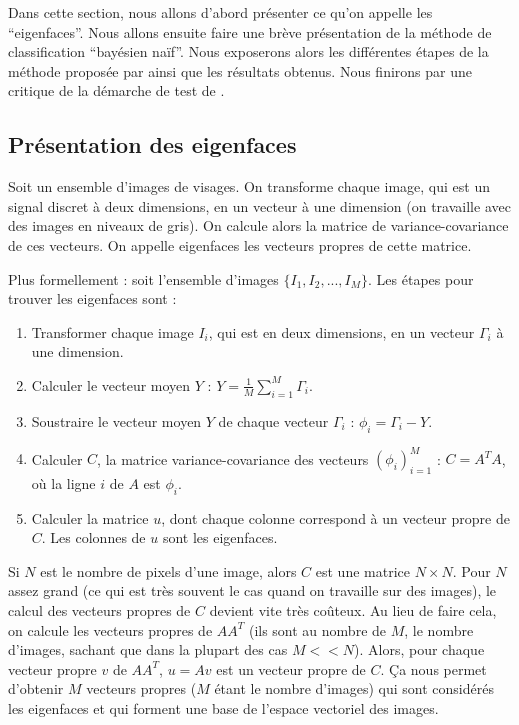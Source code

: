 Dans cette section, nous allons d'abord présenter ce qu'on appelle les ``eigenfaces''.
Nous allons ensuite faire une brève présentation de la méthode de classification
``bayésien naïf''. Nous exposerons alors les différentes étapes de la méthode proposée
par \cite{article} ainsi que les résultats obtenus. Nous finirons par une critique de
la démarche de test de \cite{article}.


\subsection{Présentation des eigenfaces} \label{subsection:presentation_eigenfaces}
Soit un ensemble d'images de visages. On transforme chaque image, qui est un signal
discret à deux dimensions, en un vecteur à une dimension (on travaille avec des
images en niveaux de gris). On calcule alors la matrice de variance-covariance
de ces vecteurs. On appelle eigenfaces les vecteurs propres de cette matrice.

Plus formellement : soit l'ensemble d'images $\{I_1, I_2, ..., I_M\}$.
Les étapes pour trouver les eigenfaces sont :
\begin{enumerate}
    \item Transformer chaque image $I_i$, qui est en deux dimensions,
    en un vecteur $\Gamma_i$ à une dimension.
    \item Calculer le vecteur moyen $Y$ : $Y = \frac{1}{M} \sum_{i=1}^M \Gamma_i$.
    \item Soustraire le vecteur moyen $Y$ de chaque vecteur $\Gamma_i$ : $\phi_i = \Gamma_i - Y$.
    \item Calculer $C$, la matrice variance-covariance des vecteurs $(\phi_i)_{i=1}^M$ :
    $C = A^TA$, où la ligne $i$ de $A$ est $\phi_i$.
    \item Calculer la matrice $u$, dont chaque colonne correspond à un vecteur
    propre de $C$. Les colonnes de $u$ sont les eigenfaces.
\end{enumerate}
Si $N$ est le nombre de pixels d'une image, alors $C$ est une matrice $N \times N$.
Pour $N$ assez grand (ce qui est très souvent le cas quand on travaille sur des images),
le calcul des vecteurs propres de $C$ devient vite très coûteux. Au lieu de faire cela,
on calcule les vecteurs propres de $AA^T$ (ils sont au nombre de $M$, le nombre d'images,
sachant que dans la plupart des cas $M << N$). Alors, pour chaque vecteur propre $v$ de
$AA^T$, $u = Av$ est un vecteur propre de $C$. Ça nous permet d'obtenir $M$ vecteurs
propres ($M$ étant le nombre d'images) qui sont considérés les eigenfaces et qui forment
une base de l'espace vectoriel des images.



